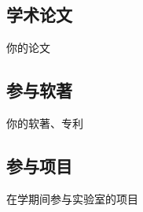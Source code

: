 
\begin{resume}





  \subsection*{学术论文}

  \begin{achievements}
    \item 你的论文
  \end{achievements}

  \subsection*{参与软著}

  \begin{achievements}
    \item 你的软著、专利
  \end{achievements}

  \subsection*{参与项目}
  \begin{achievements}
    \item 在学期间参与实验室的项目
  \end{achievements}
\end{resume}

